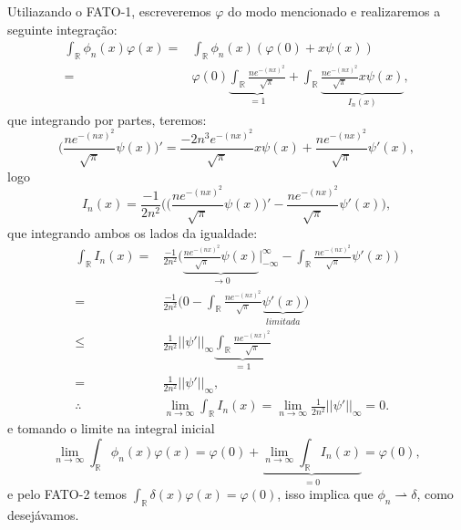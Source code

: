 \documentclass{article}
\begin{document}
\begin{enumerate}
\begin{enumerate}
				Utiliazando o FATO-1, escreveremos $\varphi$ do modo mencionado e realizaremos a seguinte integração:
				$$
				\begin{aligned}
				\int_{\mathbb{R}} \phi_{n}(x)\varphi(x) 
				= &\int_{\mathbb{R}} \phi_{n}(x)(\varphi(0) + x\psi(x)) \\
				= & \varphi(0) \underbrace{\int_{\mathbb{R}} \frac{ne^{-(nx)^{2}}}{\sqrt{\pi}} }_{=1} + \int_{\mathbb{R}} \underbrace{ \frac{ne^{-(nx)^{2}}}{\sqrt{\pi}} x\psi(x) }_{I_{n}(x)},
				\end{aligned}
				$$
				que integrando por partes, teremos:
				$$
				\Big(\frac{ne^{-(nx)^{2}}}{\sqrt{\pi}} \psi(x)\Big)' = \frac{-2n^{3}e^{-(nx)^{2}}}{\sqrt{\pi}} x\psi(x) + \frac{ne^{-(nx)^{2}}}{\sqrt{\pi}} \psi'(x), 
				$$
				logo
				$$
				I_{n}(x) = \frac{-1}{2n^{2}}	\Big( \Big( \frac{ne^{-(nx)^{2}}}{\sqrt{\pi}} \psi(x)\Big)' - \frac{ne^{-(nx)^{2}}}{\sqrt{\pi}} \psi'(x) \Big), 
				$$
				que integrando ambos os lados da igualdade:
				$$
				\begin{aligned}
				\int_{\mathbb{R}} I_{n}(x) 
				= & \frac{-1}{2n^{2}}	\Big(  \underbrace{ \frac{ne^{-(nx)^{2}}}{\sqrt{\pi}} \psi(x) }_{\to 0} \Big|^{\infty}_{-\infty} - \int_{\mathbb{R}} \frac{ne^{-(nx)^{2}}}{\sqrt{\pi}} \psi'(x) \Big) \\
				= & \frac{-1}{2n^{2}}	\Big(  0 - \int_{\mathbb{R}} \frac{ne^{-(nx)^{2}}}{\sqrt{\pi}} \underbrace{ \psi'(x) }_{limitada} \Big) \\
				\leq & \frac{1}{2n^{2}} ||\psi'||_{\infty} \underbrace{ \int_{\mathbb{R}} \frac{ne^{-(nx)^{2}}}{\sqrt{\pi}} }_{=1} \\
				= & \frac{1}{2n^{2}} ||\psi'||_{\infty}, \\
				\therefore & \lim_{n \to \infty} \int_{\mathbb{R}} I_{n}(x) = \lim_{n \to \infty}  \frac{1}{2n^{2}} ||\psi'||_{\infty} = 0.
				\end{aligned}
				$$
				e tomando o limite na integral inicial
				$$
				\lim_{n \to \infty} \int_{\mathbb{R}} \phi_{n}(x)\varphi(x) 
				= \varphi(0) + \underbrace{ \lim_{n \to \infty} \int_{\mathbb{R}} I_{n}(x) }_{=0}= \varphi(0),
				$$
				e pelo FATO-2 temos $\int_{\mathbb{R}} \delta(x)\varphi(x) = \varphi(0)$, isso implica que $\phi_{n} \rightharpoonup \delta$, como desejávamos.
				
			\end{enumerate}	
		

\end{enumerate}
\end{document}
